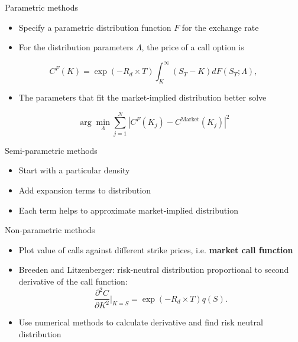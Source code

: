 \documentclass[ignorenonframetext,aspectratio=169]{beamer}
\providecommand{\tightlist}{%
  \setlength{\itemsep}{0pt}\setlength{\parskip}{0pt}}
\begin{document}
\begin{frame}{Parametric methods}

\begin{itemize}
\tightlist
\item
  Specify a parametric distribution function \(F\) for the exchange rate
\item
  For the distribution parameters \(\Lambda\), the price of a call
  option is
\end{itemize}

\[
C^F(K) = \exp(-R_d\times T) \int_{K}^{\infty} \left( S_T - K\right) dF(S_T; \Lambda), 
\]

\begin{itemize}
\tightlist
\item
  The parameters that fit the market-implied distribution better solve
\end{itemize}

\[
\arg\min_{\Lambda} \sum_{j=1}^N |C^F(K_j) - C^{\text{Market}}(K_j)|^2
\]

\end{frame}

\begin{frame}{Semi-parametric methods}

\begin{itemize}
\tightlist
\item
  Start with a particular density
\item
  Add expansion terms to distribution
\item
  Each term helps to approximate market-implied distribution
\end{itemize}

\end{frame}

\begin{frame}{Non-parametric methods}

\begin{itemize}
\tightlist
\item
  Plot value of calls against different strike prices, i.e.
  \textbf{market call function}
\item
  Breeden and Litzenberger: risk-neutral distribution proportional to
  second derivative of the call function: \[
  \frac{\partial^2 C}{\partial K^2} \bigg\rvert_{K=S} = \exp(-R_d \times T)q(S).
  \]
\item
  Use numerical methods to calculate derivative and find risk neutral
  distribution
\end{itemize}

\end{frame}
\end{document}

